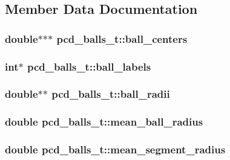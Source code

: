 \subsection{Member Data Documentation}
\hypertarget{structpcd__balls__t_a7d1e3915e85271fc3b84ea8896aca325}{
\subsubsection[{ball\_\-centers}]{\setlength{\rightskip}{0pt plus 5cm}double$\ast$$\ast$$\ast$ {\bf pcd\_\-balls\_\-t::ball\_\-centers}}}
\label{structpcd__balls__t_a7d1e3915e85271fc3b84ea8896aca325}
\hypertarget{structpcd__balls__t_ac938809b697f45105ecdc5bb136d00b3}{
\subsubsection[{ball\_\-labels}]{\setlength{\rightskip}{0pt plus 5cm}int$\ast$ {\bf pcd\_\-balls\_\-t::ball\_\-labels}}}
\label{structpcd__balls__t_ac938809b697f45105ecdc5bb136d00b3}
\hypertarget{structpcd__balls__t_a7f37e3299ad6f5e57c87c91455188968}{
\subsubsection[{ball\_\-radii}]{\setlength{\rightskip}{0pt plus 5cm}double$\ast$$\ast$ {\bf pcd\_\-balls\_\-t::ball\_\-radii}}}
\label{structpcd__balls__t_a7f37e3299ad6f5e57c87c91455188968}
\hypertarget{structpcd__balls__t_a4374bb4373788437e133d05ffe1c7cca}{
\subsubsection[{mean\_\-ball\_\-radius}]{\setlength{\rightskip}{0pt plus 5cm}double {\bf pcd\_\-balls\_\-t::mean\_\-ball\_\-radius}}}
\label{structpcd__balls__t_a4374bb4373788437e133d05ffe1c7cca}
\hypertarget{structpcd__balls__t_a3d80371d7775a4954c290f071445ed97}{
\subsubsection[{mean\_\-segment\_\-radius}]{\setlength{\rightskip}{0pt plus 5cm}double {\bf pcd\_\-balls\_\-t::mean\_\-segment\_\-radius}}}
